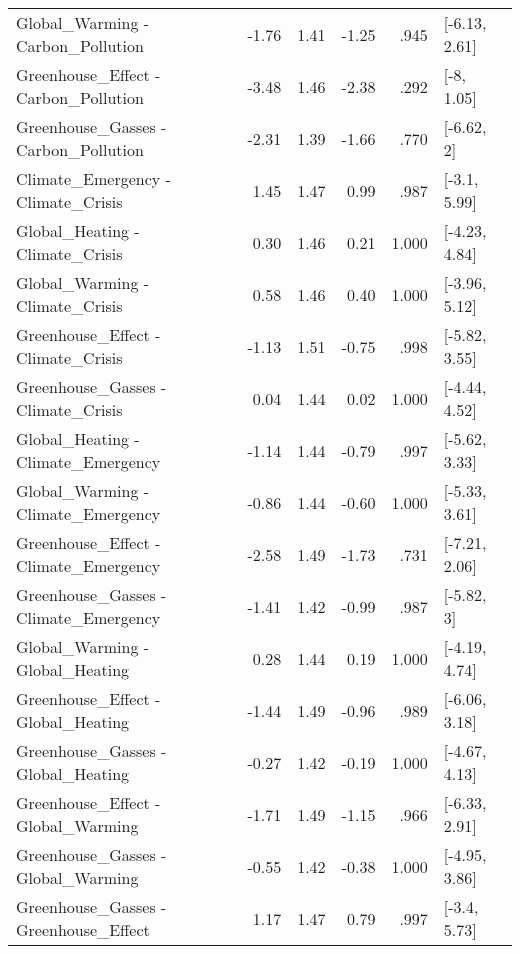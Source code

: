 \begin{table}[ht]
\begin{tabular}{lrrrrl}
  Global\_Warming - Carbon\_Pollution & -1.76 & 1.41 & -1.25 & .945 & [-6.13, 2.61] \\ 
  Greenhouse\_Effect - Carbon\_Pollution & -3.48 & 1.46 & -2.38 & .292 & [-8, 1.05] \\ 
  Greenhouse\_Gasses - Carbon\_Pollution & -2.31 & 1.39 & -1.66 & .770 & [-6.62, 2] \\ 
  Climate\_Emergency - Climate\_Crisis & 1.45 & 1.47 & 0.99 & .987 & [-3.1, 5.99] \\ 
  Global\_Heating - Climate\_Crisis & 0.30 & 1.46 & 0.21 & 1.000 & [-4.23, 4.84] \\ 
  Global\_Warming - Climate\_Crisis & 0.58 & 1.46 & 0.40 & 1.000 & [-3.96, 5.12] \\ 
  Greenhouse\_Effect - Climate\_Crisis & -1.13 & 1.51 & -0.75 & .998 & [-5.82, 3.55] \\ 
  Greenhouse\_Gasses - Climate\_Crisis & 0.04 & 1.44 & 0.02 & 1.000 & [-4.44, 4.52] \\ 
  Global\_Heating - Climate\_Emergency & -1.14 & 1.44 & -0.79 & .997 & [-5.62, 3.33] \\ 
  Global\_Warming - Climate\_Emergency & -0.86 & 1.44 & -0.60 & 1.000 & [-5.33, 3.61] \\ 
  Greenhouse\_Effect - Climate\_Emergency & -2.58 & 1.49 & -1.73 & .731 & [-7.21, 2.06] \\ 
  Greenhouse\_Gasses - Climate\_Emergency & -1.41 & 1.42 & -0.99 & .987 & [-5.82, 3] \\ 
  Global\_Warming - Global\_Heating & 0.28 & 1.44 & 0.19 & 1.000 & [-4.19, 4.74] \\ 
  Greenhouse\_Effect - Global\_Heating & -1.44 & 1.49 & -0.96 & .989 & [-6.06, 3.18] \\ 
  Greenhouse\_Gasses - Global\_Heating & -0.27 & 1.42 & -0.19 & 1.000 & [-4.67, 4.13] \\ 
  Greenhouse\_Effect - Global\_Warming & -1.71 & 1.49 & -1.15 & .966 & [-6.33, 2.91] \\ 
  Greenhouse\_Gasses - Global\_Warming & -0.55 & 1.42 & -0.38 & 1.000 & [-4.95, 3.86] \\ 
  Greenhouse\_Gasses - Greenhouse\_Effect & 1.17 & 1.47 & 0.79 & .997 & [-3.4, 5.73] \\ 
   \hline
\end{tabular}
\end{table}
